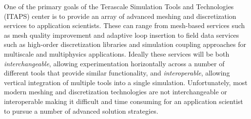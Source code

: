 \documentclass{article}
\begin{document}
One of the primary goals of the Terascale Simulation Tools and 
Technologies (ITAPS) center is to provide an array of advanced 
meshing and discretization services to application scientists. 
These can range from mesh-based services such as mesh quality 
improvement and adaptive loop insertion to field data services 
such as high-order discretization libraries and simulation coupling 
approaches for multiscale and multiphysics applications. Ideally 
these services will be both \emph{interchangeable}, allowing experimentation 
horizontally across a number of different tools that provide 
similar functionality, and \emph{interoperable}, allowing vertical 
integration of multiple tools into a single simulation. Unfortunately, 
most modern meshing and discretization technologies are not interchangeable 
or interoperable making it difficult and time consuming for an 
application scientist to pursue a number of advanced solution 
strategies. \\
\end{document}
